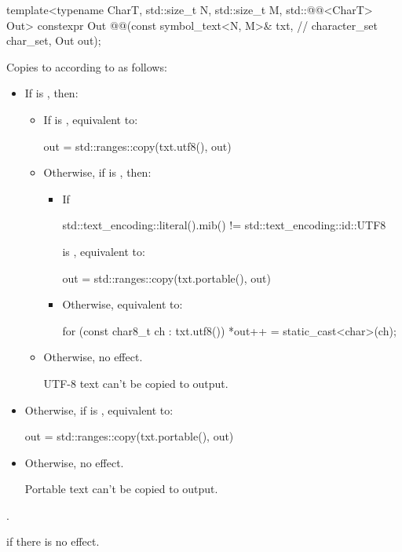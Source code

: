 \begin{itemdecl}
template<typename CharT, std::size_t N, std::size_t M, std::@@<CharT> Out>
constexpr Out @@(const symbol_text<N, M>& txt,  // \expos
                               character_set char_set, Out out);
\end{itemdecl}

\begin{itemdescr}
\pnum
\effects
Copies  to  according to  as follows:
\begin{itemize}
\item
If  is , then:
\begin{itemize}
\item
If  is , equivalent to:
\begin{codeblock}
out = std::ranges::copy(txt.utf8(), out)
\end{codeblock}
\item
Otherwise, if  is , then:
\begin{itemize}
\item
If
\begin{codeblock}
std::text_encoding::literal().mib() != std::text_encoding::id::UTF8
\end{codeblock}
is , equivalent to:
\begin{codeblock}
out = std::ranges::copy(txt.portable(), out)
\end{codeblock}
\item
Otherwise, equivalent to:
\begin{codeblock}
for (const char8_t ch : txt.utf8()) *out++ = static_cast<char>(ch);
\end{codeblock}
\end{itemize}
\item
Otherwise, no effect.
\begin{note}
UTF-8 text can't be copied to  output.
\end{note}
\end{itemize}
\item
Otherwise, if  is , equivalent to:
\begin{codeblock}
out = std::ranges::copy(txt.portable(), out)
\end{codeblock}
\item
Otherwise, no effect.
\begin{note}
Portable text can't be copied to  output.
\end{note}
\end{itemize}

\pnum
\returns
{}.

\pnum
\throws
{} if there is no effect.
\end{itemdescr}


